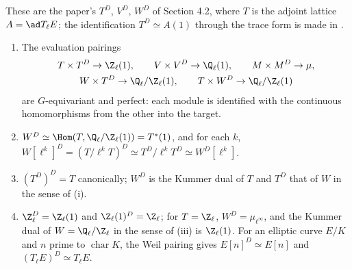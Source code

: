 These are the paper's $T^D$, $V^D$, $W^D$ of Section 4.2, where $T$ is the adjoint lattice $A=\ad T_\ell E$; the identification $T^D\simeq A(1)$ through the trace form
is made in .

\begin{proposition}\label{prop:galcoh:kummer-duals}
\begin{enumerate}[label=(\roman*)]
\item The evaluation pairings
\begin{gather*}
T\times T^D\to\Z_\ell(1),\qquad V\times V^D\to\Q_\ell(1),\qquad M\times M^D\to\mu,\\
W\times T^D\to\Q_\ell/\Z_\ell(1),\qquad T\times W^D\to\Q_\ell/\Z_\ell(1)
\end{gather*}
are $G$-equivariant and perfect: each module is identified with the continuous homomorphisms from the other into the target.
\item $W^D\simeq\Hom(T,\Q_\ell/\Z_\ell(1))=T^*(1)$, and for each $k$, $W[\ell^k]^D=(T/\ell^kT)^D\simeq T^D/\ell^kT^D\simeq W^D[\ell^k]$.
\item $(T^D)^D=T$ canonically; $W^D$ is the Kummer dual of $T$ and $T^D$ that of $W$ in the sense of (i).
\item $\Z_\ell^D=\Z_\ell(1)$ and $\Z_\ell(1)^D=\Z_\ell$; for $T=\Z_\ell$, $W^D=\mu_{\ell^\infty}$, and the Kummer dual of $W=\Q_\ell/\Z_\ell$ in the sense of (iii) is $\Z_\ell(1)$. For an elliptic curve $E/K$ and $n$ prime to
$\operatorname{char}K$, the Weil pairing gives $E[n]^D\simeq E[n]$ and $(T_\ell E)^D\simeq T_\ell E$.
\end{enumerate}
\end{proposition}


